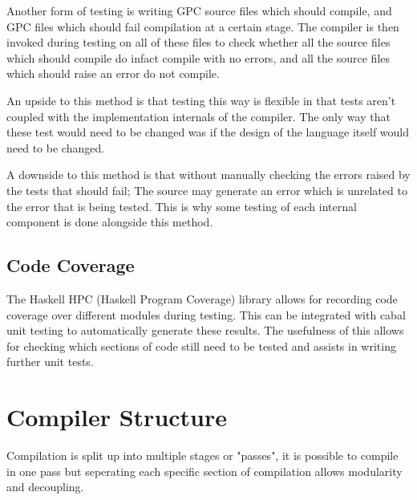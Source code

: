 Another form of testing is writing GPC source files which should compile, and
GPC files which should fail compilation at a certain stage. The compiler
is then invoked during testing on all of these files to check whether
all the source files which should compile do infact compile with no errors,
and all the source files which should raise an error do not compile.

An upside to this method is that testing this way is flexible in that
tests aren't coupled with the implementation internals of the compiler.
The only way that these test would need to be changed was if the design
of the language itself would need to be changed.

A downside to this method is that without manually checking the errors raised
by the tests that should fail; The source may generate an error which is unrelated
to the error that is being tested. This is why some testing of each internal
component is done alongside this method.

\subsection{Code Coverage}

The Haskell HPC (Haskell Program Coverage) library allows for recording
code coverage over different modules during testing. This can be integrated with
cabal unit testing to automatically generate these results. The usefulness of this
allows for checking which sections of code still need to be tested and assists
in writing further unit tests.


\section{Compiler Structure}
Compilation is split up into multiple stages or "passes",
it is possible to compile in one pass but seperating each 
specific section of compilation allows modularity and decoupling.

